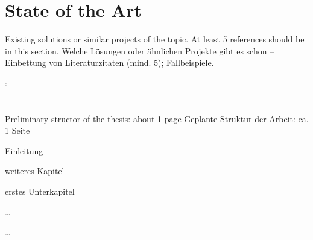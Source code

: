 \documentclass[a4paper,10pt,english]{INSOexpose}
\begin{document}
\section{State of the Art}

\langchooser
{
	Existing solutions or similar projects of the topic. At least 5 references should be in this section.
}
{
	Welche Lösungen oder ähnlichen Projekte gibt es schon – Einbettung von Literaturzitaten (mind. 5);
	Fallbeispiele.
}

: \cite{fankhauser:2009:softwaretechnik-security}

\section{}

\langchooser
{	
	Preliminary structor of the thesis: about 1 page
}
{
	Geplante Struktur der Arbeit: ca. 1 Seite	
}


\begin{samepage}
  \begin{contentstructure}
    \item Einleitung	
    \item weiteres Kapitel 
    \begin{contentstructure}
      \item erstes Unterkapitel
      \item \dots
    \end{contentstructure}
    \item \dots
  \end{contentstructure}
\end{samepage}


\printbibliography
\end{document}

